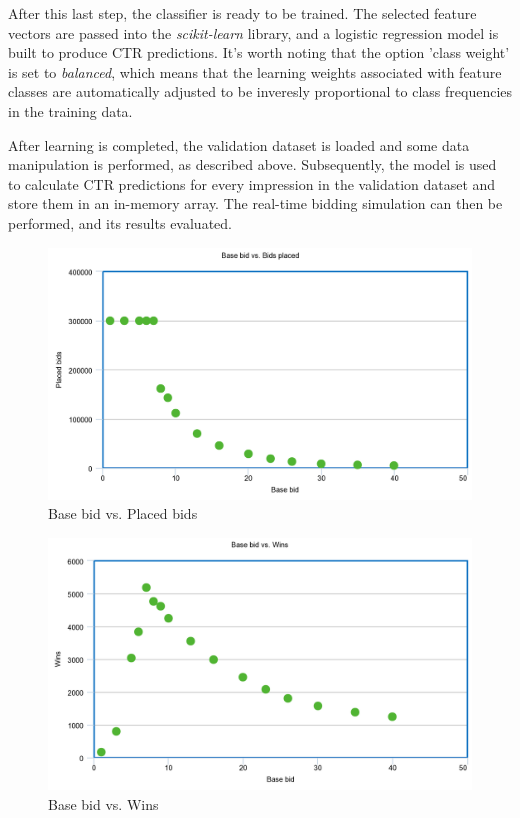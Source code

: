 \documentclass{sig-alternate-05-2015}
\begin{document}
After this last step, the classifier is ready to be trained. The selected feature vectors are passed into the \textit{scikit-learn} library, and a logistic regression model is built to produce CTR predictions. It's worth noting that the option 'class weight' is set to \textit{balanced}, which means that the learning weights associated with feature classes are automatically adjusted to be inveresly proportional to class frequencies in the training data.

After learning is completed, the validation dataset is loaded and some data manipulation is performed, as described above. Subsequently, the model is used to calculate CTR predictions for every impression in the validation dataset and store them in an in-memory array. The real-time bidding simulation can then be performed, and its results evaluated.

\begin{figure}
  \includegraphics[width=\linewidth]{linear_bids.png}
  \caption{Base bid vs. Placed bids}
  \label{fig:bids}
\end{figure}

\begin{figure}
  \includegraphics[width=\linewidth]{linear_wins.png}
  \caption{Base bid vs. Wins}
  \label{fig:bids}
\end{figure}
\end{document}
